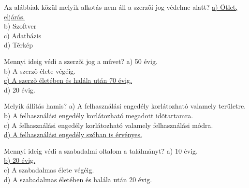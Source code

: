 \begin{frame}

\begin{tcolorbox}[title={180. Kérdés}]
Az alábbiak közül melyik alkotás nem áll a szerzõi jog védelme alatt?
\tcblower
\uline {a) Ötlet, eljárás.}\\
b) Szoftver\\
c) Adatbázis\\
d) Térkép
\end{tcolorbox}

\begin{tcolorbox}[title={181. Kérdés}]
Mennyi ideig védi a szerzõi jog a mûvet?
\tcblower
a) 50 évig.\\
b) A szerzõ élete végéig.\\
\uline {c) A szerzõ életében és halála után 70 évig.}\\
d) 20 évig.
\end{tcolorbox}

\begin{tcolorbox}[title={182. Kérdés}]
Melyik állítás hamis?
\tcblower
a) A felhasználási engedély korlátozható valamely területre.\\
b) A felhasználási engedély korlátozható megadott idõtartamra.\\
c) A felhasználási engedély korlátozható valamely felhasználási módra.\\
\uline {d) A felhasználási engedély szóban is érvényes.}
\end{tcolorbox}

\begin{tcolorbox}[title={183. Kérdés}]
Mennyi ideig védi a szabadalmi oltalom a találmányt?
\tcblower
a) 10 évig.\\
\uline {b) 20 évig.}\\
c) A szabadalmas élete végéig.\\
d) A szabadalmas életében és halála után 20 évig.
\end{tcolorbox}

\end{frame}


